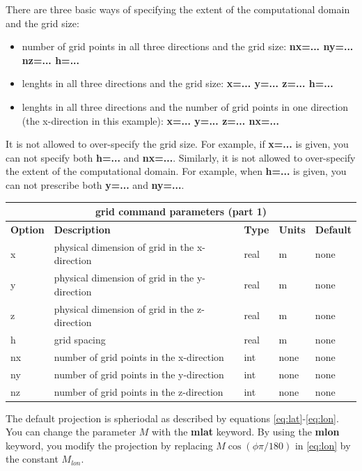 \documentclass[11pt]{report}
\begin{document}
There are three basic ways of specifying the extent of the computational domain and the grid size:  
\begin{itemize}
   \item number of grid points in all three directions and the grid size: {\bf nx=... ny=... nz=... h=...}
   \item lenghts in all three directions and the grid size: {\bf x=... y=... z=... h=...}
   \item lenghts in all three directions and the number of grid points in one direction (the
   x-direction in this example): {\bf x=... y=... z=... nx=...}
\end{itemize}
It is not allowed to over-specify the grid size. For example, if {\bf x=...} is given, you can not
specify both {\bf h=...} and {\bf nx=...}. Similarly, it is not allowed to over-specify the extent
of the computational domain. For example, when {\bf h=...} is given, you can not prescribe both {\bf
  y=...} and {\bf ny=...}.
%
\begin{center}
\begin{tabular}{|l|p{8cm}|l|l|l|} \hline
\multicolumn{5}{|c|}{\bf grid command parameters (part 1)}\\ \hline
\bf{Option} & \bf{Description} & \bf{Type} & \bf{Units} & \bf{Default}\\ \hline \hline
x & physical dimension of grid in the x-direction & real & m & none\\ \hline
y & physical dimension of grid in the y-direction & real & m & none\\ \hline
z & physical dimension of grid in the z-direction & real & m & none\\ \hline
\hline
h & grid spacing & real & m & none\\ \hline
\hline
nx & number of grid points in the x-direction & int & none & none\\ \hline
ny & number of grid points in the y-direction & int & none & none\\ \hline	
nz & number of grid points in the z-direction & int & none & none\\ \hline	
\end{tabular}
\end{center}

The default projection is spheriodal as described by equations \eqref{eq:lat}-\eqref{eq:lon}. You
can change the parameter $M$ with the {\bf mlat} keyword. By using the {\bf mlon} keyword, you
modify the projection by replacing $M\cos(\phi\pi/180)$ in \eqref{eq:lon} by the constant
$M_{lon}$. 
\end{document}
